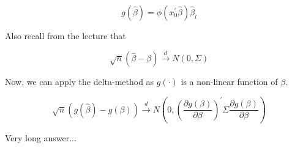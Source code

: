 {{\begin{enumerate}[label=(\alph*)]
{$$
g(\hat{\beta})=\phi\left(x_{0}^{\prime} \hat{\beta}\right) \hat{\beta}_{l}
$$

Also recall from the lecture that

$$
\sqrt{n}(\hat{\beta}-\beta) \xrightarrow{d} N(0, \Sigma)
$$

Now, we can apply the delta-method as $g(\cdot)$ is a non-linear function of $\beta$.

$$
\sqrt{n}(g(\hat{\beta})-g(\beta)) \xrightarrow{d} N\left(0,\left(\frac{\partial g(\beta)}{\partial \beta}\right)^{\prime} \Sigma \frac{\partial{g}(\beta)}{\partial \beta}\right)
$$
}
{\item 
\color{red} Very long answer... \color{black}
}
\end{enumerate}
}
}
